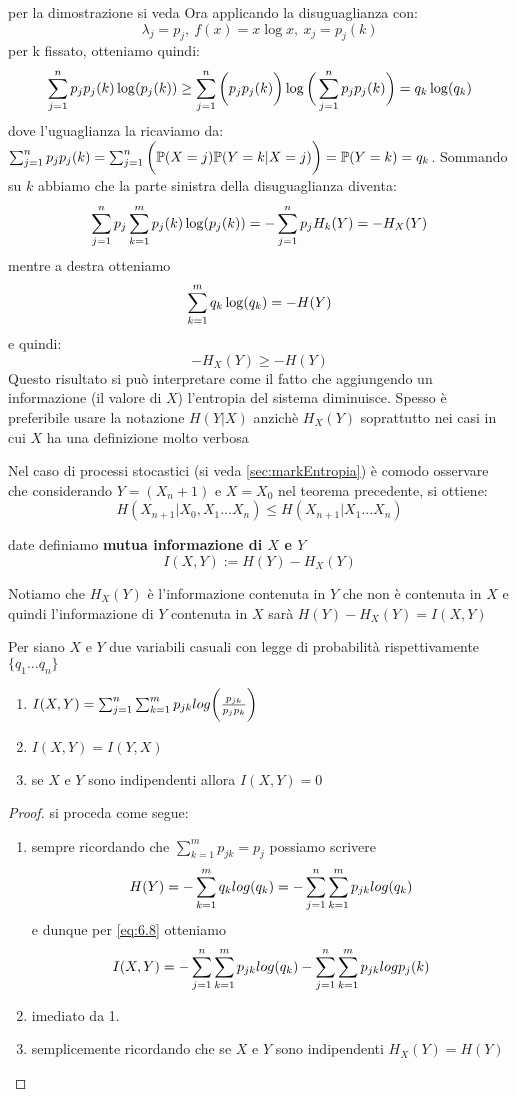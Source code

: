 per la dimostrazione si veda \cite{Jensen}
Ora applicando la disuguaglianza con:
$$\lambda_j=p_j,\ f(x)=x \log x, \  x_j=p_j(k)$$
per k fissato, otteniamo quindi:
$$\sum_{j=1}^n p_j p_j(k)\log (p_j(k))\geq \sum_{j=1}^n \bigg( p_j p_j(k) \bigg) \log \bigg( \sum_{j=1}^n p_j p_j(k) \bigg)=q_k \log (q_k)$$
dove l'uguaglianza la ricaviamo da: $\sum_{j=1}^n p_j p_j(k)=\sum_{j=1}^n \bigg( \mathbb{P}(X=j) \mathbb{P}(Y=k|X=j) \bigg)= \mathbb{P}(Y=k)= q_k$.
Sommando su $k$ abbiamo che la parte sinistra della disuguaglianza diventa:
$$\sum_{j=1}^n  p_j \sum_{k=1}^m p_j(k) \log (p_j(k))=-\sum_{j=1}^n p_j H_k(Y)=-H_X(Y)$$
mentre a destra otteniamo
$$\sum_{k=1}^m q_k \log (q_k)= -H(Y)$$
e quindi:
\begin{equation}
-H_X(Y) \geq -H(Y)
\end{equation}
Questo risultato si può interpretare come il fatto che aggiungendo un informazione (il valore di $X$) l'entropia del sistema diminuisce.
Spesso è preferibile usare la notazione $H(Y|X)$ anzichè $H_X(Y)$ soprattutto nei casi in cui $X$ ha una definizione molto verbosa
\begin{oss}\label{oss:disugShannon}
Nel caso di processi stocastici (si veda \ref{sec:markEntropia}) è comodo osservare che considerando $Y=(X_n+1)$ e $X=X_0$ nel teorema precedente, si ottiene:
$$H(X_{n+1}|X_0,X_1...X_n) \leq H(X_{n+1}|X_1...X_n)$$
\end{oss}
\begin{defi}
date \var definiamo \textbf{mutua informazione di $X$ e $Y$}
\begin{equation} \label{defi:mutua}
I(X,Y):=H(Y)-H_X(Y)
\end{equation}
\end{defi}

Notiamo che $H_X(Y)$ è l'informazione contenuta in $Y$ che non è contenuta in $X$ e quindi l'informazione di $Y$ contenuta in $X$ sarà $H(Y)-H_X(Y)=I(X,Y)$
\begin{teo} \label{teo:6.7}
Per siano $X$ e $Y$ due variabili casuali con legge di probabilità rispettivamente \lep $\{q_1...q_n \}$
\begin{enumerate}
\item $I(X,Y)=\sum_{j=1}^n \sum_{k=1}^m p_{jk}log \bigg( \frac{p_{jk}}{p_j p_k} \bigg)$
\item $I(X,Y)=I(Y,X)$
\item se $X$ e $Y$ sono indipendenti allora $I(X,Y)=0$
\end{enumerate}
\end{teo}
\begin{proof}
si proceda come segue:
\begin{enumerate}
\item sempre ricordando che $\sum_{k=1}^m p_{jk}=p_j$ possiamo scrivere 
$$H(Y)=-\sum_{k=1}^m q_{k}log (q_k)=-\sum_{j=1}^n \sum_{k=1}^m p_{jk} log (q_k)$$
e dunque per \ref{eq:6.8} otteniamo
$$I(X,Y)=-\sum_{j=1}^n \sum_{k=1}^m p_{jk}log(q_k)-\sum_{j=1}^n \sum_{k=1}^m p_{jk}log{p_j(k)}$$
\item imediato da 1.
\item semplicemente ricordando che se $X$ e $Y$ sono indipendenti $H_X(Y)=H(Y)$
\end{enumerate}
\end{proof}


